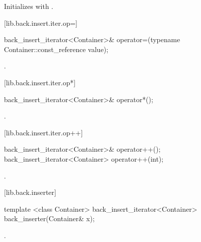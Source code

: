 \begin{itemdescr}
\pnum
\effects
Initializes
with .
\end{itemdescr}

[lib.back.insert.iter.op=]{}

%
\begin{itemdecl}
back_insert_iterator<Container>&
  operator=(typename Container::const_reference value);
\end{itemdecl}

\begin{itemdescr}
\pnum
\effects
{}

\pnum
\returns
{}.
\end{itemdescr}

[lib.back.insert.iter.op*]{}

%
\begin{itemdecl}
back_insert_iterator<Container>& operator*();
\end{itemdecl}

\begin{itemdescr}
\pnum
\returns
{}.
\end{itemdescr}

[lib.back.insert.iter.op++]{}

%
\begin{itemdecl}
back_insert_iterator<Container>& operator++();
back_insert_iterator<Container>  operator++(int);
\end{itemdecl}

\begin{itemdescr}
\pnum
\returns
{}.
\end{itemdescr}

[lib.back.inserter]{ }

%
\begin{itemdecl}
template <class Container>
  back_insert_iterator<Container> back_inserter(Container& x);
\end{itemdecl}

\begin{itemdescr}
\pnum
\returns
{}.
\end{itemdescr}

